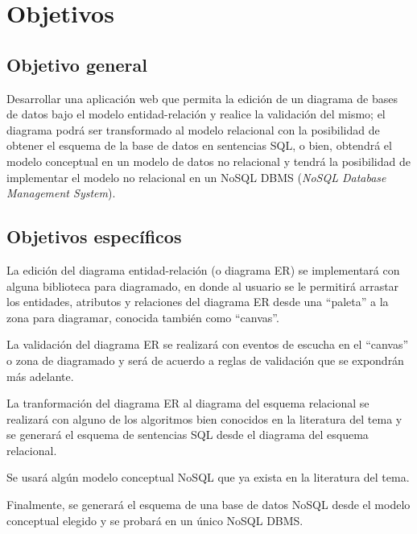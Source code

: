 \section{Objetivos}

\subsection*{Objetivo general}
Desarrollar una aplicación web que permita la edición de un diagrama de bases de datos bajo el modelo entidad-relación y realice la validación del mismo; el diagrama podrá ser transformado al modelo relacional con la posibilidad de obtener el esquema de la base de datos en sentencias SQL, o bien, obtendrá el modelo conceptual en un modelo de datos no relacional y tendrá la posibilidad de implementar el modelo no relacional en un NoSQL DBMS (\textit{NoSQL Database Management System}).

\subsection*{Objetivos específicos}

La edición del diagrama entidad-relación (o diagrama ER) se implementará con alguna biblioteca para diagramado, en donde al usuario se le permitirá arrastar los entidades, atributos y relaciones del diagrama ER desde una ``paleta''  a la zona para diagramar, conocida también como ``canvas''.


La validación del diagrama ER se realizará con eventos de escucha en el ``canvas'' o zona de diagramado y será de acuerdo a reglas de validación que se expondrán más adelante.


La tranformación del diagrama ER al diagrama del esquema relacional se realizará con alguno de los algoritmos bien conocidos en la literatura del tema y se generará el esquema de sentencias SQL desde el diagrama del esquema relacional.


Se usará algún modelo conceptual NoSQL que ya exista en la literatura del tema.


Finalmente, se generará el esquema de una base de datos NoSQL desde el modelo conceptual elegido y se probará en un único NoSQL DBMS.